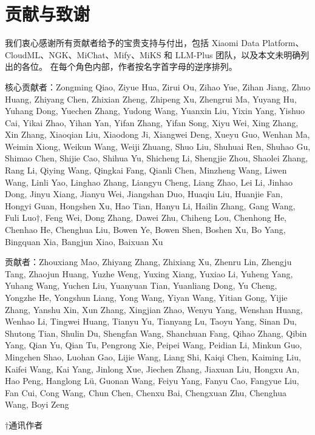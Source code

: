 \documentclass[
  10
]{article}
\begin{document}
\section{贡献与致谢}\label{a-contributions-and-acknowledgments}

我们衷心感谢所有贡献者给予的宝贵支持与付出，包括 Xiaomi Data Platform、
CloudML、NGK、MiChat、Mify、MiKS 和 LLM-Plus 团队，以及本文未明确列出的各位。
在每个角色内部，作者按名字首字母的逆序排列。

核心贡献者：Zongming Qiao, Ziyue Hua, Zirui Ou, Zihao Yue, Zihan
Jiang, Zhuo Huang, Zhiyang Chen, Zhixian Zheng, Zhipeng Xu, Zhengrui Ma,
Yuyang Hu, Yuhang Dong, Yuechen Zhang, Yudong Wang, Yuanxin Liu, Yixin
Yang, Yishuo Cai, Yikai Zhao, Yihan Yan, Yifan Zhang, Yifan Song, Xiyu
Wei, Xing Zhang, Xin Zhang, Xiaoqian Liu, Xiaodong Ji, Xiangwei Deng,
Xueyu Guo, Wenhan Ma, Weimin Xiong, Weikun Wang, Weiji Zhuang, Shuo Liu,
Shuhuai Ren, Shuhao Gu, Shimao Chen, Shijie Cao, Shihua Yu, Shicheng Li,
Shengjie Zhou, Shaolei Zhang, Rang Li, Qiying Wang, Qingkai Fang, Qianli
Chen, Minzheng Wang, Liwen Wang, Linli Yao, Linghao Zhang, Liangyu
Cheng, Liang Zhao, Lei Li, Jinhao Dong, Jinyu Xiang, Jianyu Wei,
Jiangshan Duo, Huaqiu Liu, Huanjie Fan, Hongyi Guan, Hongshen Xu, Hao
Tian, Hanyu Li, Hailin Zhang, Gang Wang, Fuli Luo†, Feng Wei, Dong
Zhang, Dawei Zhu, Chiheng Lou, Chenhong He, Chenhao He, Chenghua Liu,
Bowen Ye, Bowen Shen, Boshen Xu, Bo Yang, Bingquan Xia, Bangjun Xiao,
Baixuan Xu

贡献者：Zhouxiang Mao, Zhiyang Zhang, Zhixiang Xu, Zhenru Lin,
Zhengju Tang, Zhaojun Huang, Yuzhe Weng, Yuxing Xiang, Yuxiao Li, Yuheng
Yang, Yuhang Wang, Yuchen Liu, Yuanyuan Tian, Yuanliang Dong, Yu Cheng,
Yongzhe He, Yongshun Liang, Yong Wang, Yiyan Wang, Yitian Gong, Yijie
Zhang, Yanshu Xin, Xun Zhang, Xingjian Zhao, Wenyu Yang, Wenshan Huang,
Wenhao Li, Tingwei Huang, Tianyu Yu, Tianyang Lu, Taoyu Yang, Sinan Du,
Shutong Tian, Shulin Du, Shengfan Wang, Shanchuan Fang, Qihao Zhang,
Qibin Yang, Qian Yu, Qian Tu, Pengrong Xie, Peipei Wang, Peidian Li,
Minkun Guo, Mingchen Shao, Luohan Gao, Lijie Wang, Liang Shi, Kaiqi
Chen, Kaiming Liu, Kaifei Wang, Kai Yang, Jinlong Xue, Jiechen Zhang,
Jiaxuan Liu, Hongxu An, Hao Peng, Hanglong Lü, Guonan Wang, Feiyu Yang,
Fanyu Cao, Fangyue Liu, Fan Cui, Cong Wang, Chun Chen, Chenxu Bai,
Chengxuan Zhu, Chenghua Wang, Boyi Zeng

†通讯作者
\end{document}
